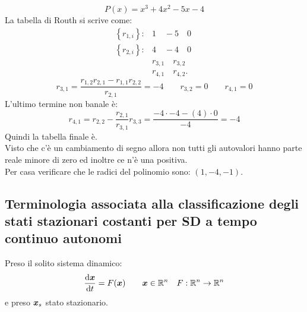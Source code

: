 \begin{exmp}
    \[
	P(x)= x^3 + 4x^2 - 5x - 4
    \] 
    La tabella di Routh si scrive come:
    \[\begin{aligned}
	\left\{r_{1, i}\right\}: &1 \quad - 5 \quad 0 \\
	\left\{r_{2, i}\right\}: &4 \quad - 4 \quad 0 \\
	   &r_{3, 1} \quad r_{3, 2} \quad \\
	   &r_{4, 1} \quad r_{4,2}
    .\end{aligned}\]
    \[
        r_{3,1}= \frac{r_{1, 2}r_{2, 1}- r_{1, 1}r_{2, 2}}{r_{2, 1}} = -4 \qquad r_{3, 2}= 0 \qquad r_{4, 1} = 0
    \] 
    L'ultimo termine non banale è:
    \[
	r_{4, 1} = r_{2, 2}- \frac{r_{2, 1}}{r_{3, 1}}r_{3,3} = \frac{-4 \cdot -4 - (4)\cdot 0 }{-4} = -4
    \] 
    Quindi la tabella finale è\sidenote{
    \[
        \begin{matrix}
	    1  & -5 & 0 \\
	    4  & -4 & 0 \\
	    -4 & 0  & 0 \\
	    -4 & 0  & 0
        \end{matrix}
    \] }.\\
    Visto che c'è un cambiamento di segno allora non tutti gli autovalori hanno parte reale minore di zero ed inoltre ce n'è una positiva. \\
    Per casa verificare che le radici del polinomio sono: $(1, -4, -1)$.
\end{exmp}
\noindent
\subsection{Terminologia associata alla classificazione degli stati stazionari costanti per SD a tempo continuo autonomi}%
\label{sub:Terminologia associata alla classificazione degli stati stazionari costanti}
Preso il solito sistema dinamico:
\[
    \frac{\text{d} \boldsymbol{x}}{\text{d} t} = F(\boldsymbol{x}) \qquad \boldsymbol{x}\in \mathbb{R}^n \quad F:\mathbb{R}^n\to \mathbb{R}^n
\] 
e preso $\boldsymbol{x}_s$ stato stazionario.
